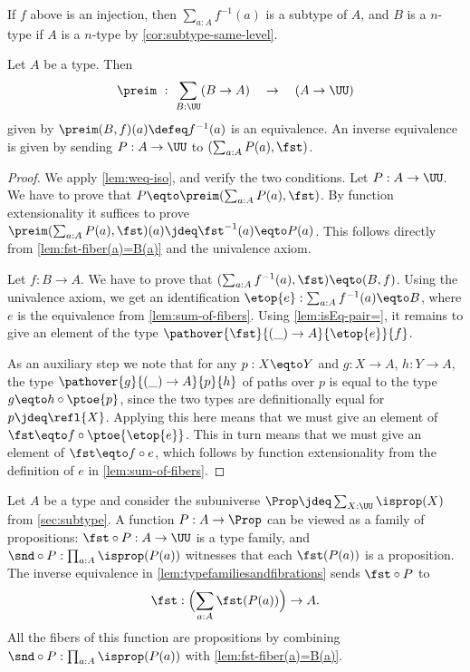 If $f$ above is an injection, then $\sum_{a:A} f^{-1}(a)$ is a subtype of $A$,
and $B$ is a $n$-type if $A$ is a $n$-type by \cref{cor:subtype-same-level}.

\begin{lemma}\label{lem:typefamiliesandfibrations}
Let $A$ be a type. Then
\[
\preim ~:~ \sum_{B:\UU}(B\to A) \quad\to\quad (A\to\UU)
\]
given by $\preim(B,f)(a)\defeq f^{-1}(a)$ is an equivalence.
An inverse equivalence is given by sending $P:A\to\UU$ to
$(\sum_{a:A}P(a), \fst)$.
\end{lemma}

\begin{proof}
We apply \cref{lem:weq-iso}, and verify the two conditions.
Let $P:A\to\UU$. We have to prove that $P \eqto \preim(\sum_{a:A}P(a), \fst)$.
By function extensionality it suffices to prove
$\preim(\sum_{a:A}P(a), \fst)(a)\jdeq \fst^{-1}(a) \eqto P(a)$.
This follows directly from \cref{lem:fst-fiber(a)=B(a)} and the univalence axiom.

Let $f: B\to A$. We have to prove that $(\sum_{a:A} f^{-1}(a), \fst) \eqto (B,f)$.
Using the univalence axiom, we get an identification
$\etop{e} : \sum_{a:A} f^{-1}(a) \eqto B$, where $e$ is the equivalence
from \cref{lem:sum-of-fibers}. Using \cref{lem:isEq-pair=},
it remains to give an element of the type $\pathover{\fst}{(\_)\to A}{\etop{e}}{f}$.

As an auxiliary step we note that for any $p: X \eqto Y$ and $g:X\to A$,
$h:Y\to A$, the type $\pathover{g}{(\_)\to A}{p}{h}$ of paths over $p$
is equal to the type $g \eqto h\circ{\ptoe{p}}$, since the two
types are definitionally equal for $p\jdeq\refl{X}$.
Applying this here means that we must give an element of
$\fst \eqto f\circ{\ptoe{\etop{e}}}$. This in turn means that
we must give an element of $\fst \eqto f\circ e$,
which follows by function extensionality from the definition
of $e$ in \cref{lem:sum-of-fibers}.
\end{proof}

Let $A$ be a type and consider the subuniverse
$\Prop\jdeq \sum_{X:\UU}\isprop(X)$ from \cref{sec:subtype}.
A function $P: A\to\Prop$ can be viewed as a family of propositions:
$\fst\circ P : A\to \UU$ is a type family, and
$\snd\circ P : \prod_{a:A} \isprop(P(a))$ witnesses
that each $\fst(P(a))$ is a proposition.
The inverse equivalence in \cref{lem:typefamiliesandfibrations}
sends $\fst\circ P$ to
\[
  \fst: \Bigl(\sum_{a:A} \fst(P(a))\Bigr) \to A.
\]
All the fibers of this function are propositions by combining
$\snd\circ P : \prod_{a:A} \isprop(P(a))$
with \cref{lem:fst-fiber(a)=B(a)}.

